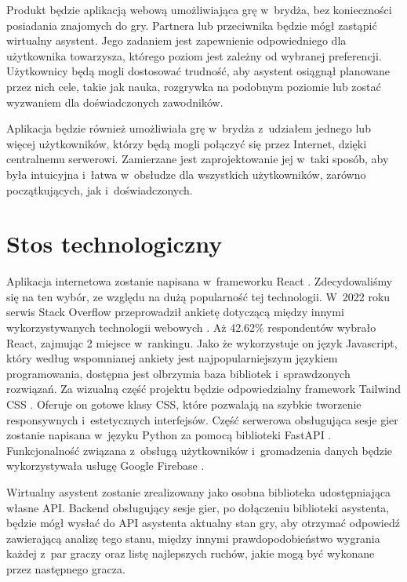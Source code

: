Produkt będzie aplikacją webową umożliwiająca grę w~brydża,
bez konieczności posiadania znajomych do gry.
Partnera lub przeciwnika będzie mógł zastąpić wirtualny asystent.
Jego zadaniem jest zapewnienie odpowiedniego
dla użytkownika towarzysza, którego poziom jest zależny od wybranej
preferencji. Użytkownicy będą mogli dostosować trudność, aby asystent osiągnął
planowane przez nich cele, takie jak nauka, rozgrywka na podobnym poziomie
lub zostać wyzwaniem dla doświadczonych zawodników.

Aplikacja będzie również umożliwiała grę w~brydża z~udziałem jednego lub więcej użytkowników,
którzy będą mogli połączyć się przez Internet, dzięki centralnemu serwerowi.
Zamierzane jest zaprojektowanie jej w~taki sposób, aby była intuicyjna i~łatwa
w~obsłudze dla wszystkich użytkowników, zarówno początkujących, jak
i~doświadczonych.


\section{Stos technologiczny}

Aplikacja internetowa zostanie napisana w~frameworku React \cite{React}.
Zdecydowaliśmy się na ten wybór, ze względu na dużą popularność tej
technologii. W~2022 roku serwis Stack Overflow \cite{StackOverflow} przeprowadził ankietę dotyczącą między innymi wykorzystywanych technologii
webowych \cite{React-stack}. Aż 42.62\% respondentów wybrało React,
zajmując 2 miejsce w~rankingu. Jako że wykorzystuje on język Javascript,
który według wspomnianej ankiety jest najpopularniejszym językiem programowania,
dostępna jest olbrzymia baza bibliotek i~sprawdzonych rozwiązań. Za wizualną
część projektu będzie odpowiedzialny framework Tailwind CSS \cite{Tailwind}.
Oferuje on gotowe klasy CSS, które pozwalają na szybkie tworzenie responsywnych
i~estetycznych interfejsów. Część serwerowa obsługująca sesje gier zostanie
napisana w~języku Python \cite{Python} za pomocą biblioteki FastAPI
\cite{FastAPI}. Funkcjonalność związana z~obsługą użytkowników i~gromadzenia
danych będzie wykorzystywała usługę Google Firebase \cite{Firebase}.

Wirtualny asystent zostanie zrealizowany jako osobna biblioteka udostępniająca
własne API. Backend obsługujący sesje gier, po dołączeniu biblioteki asystenta,
będzie mógł wysłać do API asystenta aktualny stan gry, aby otrzymać
odpowiedź zawierającą analizę tego stanu, między innymi
prawdopodobieństwo wygrania każdej z~par graczy oraz listę
najlepszych ruchów, jakie mogą być wykonane przez następnego gracza.

